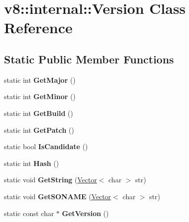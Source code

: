 \hypertarget{classv8_1_1internal_1_1_version}{}\section{v8\+:\+:internal\+:\+:Version Class Reference}
\label{classv8_1_1internal_1_1_version}
\subsection*{Static Public Member Functions}
\begin{DoxyCompactItemize}
\item 
\hypertarget{classv8_1_1internal_1_1_version_a3d8a7322a94b24a794e232e39a810532}{}static int {\bfseries Get\+Major} ()\label{classv8_1_1internal_1_1_version_a3d8a7322a94b24a794e232e39a810532}

\item 
\hypertarget{classv8_1_1internal_1_1_version_a72873948c8d86b18bbf1059481259af8}{}static int {\bfseries Get\+Minor} ()\label{classv8_1_1internal_1_1_version_a72873948c8d86b18bbf1059481259af8}

\item 
\hypertarget{classv8_1_1internal_1_1_version_a5fc1a8f4abe00d63ce6b1de28aa10623}{}static int {\bfseries Get\+Build} ()\label{classv8_1_1internal_1_1_version_a5fc1a8f4abe00d63ce6b1de28aa10623}

\item 
\hypertarget{classv8_1_1internal_1_1_version_a60b6f29b460ab319280241a1b6273330}{}static int {\bfseries Get\+Patch} ()\label{classv8_1_1internal_1_1_version_a60b6f29b460ab319280241a1b6273330}

\item 
\hypertarget{classv8_1_1internal_1_1_version_ae62c0c059d688ed1b252311d319b56dd}{}static bool {\bfseries Is\+Candidate} ()\label{classv8_1_1internal_1_1_version_ae62c0c059d688ed1b252311d319b56dd}

\item 
\hypertarget{classv8_1_1internal_1_1_version_a3cda690f1ad81757d86a7fe3d97ebef4}{}static int {\bfseries Hash} ()\label{classv8_1_1internal_1_1_version_a3cda690f1ad81757d86a7fe3d97ebef4}

\item 
\hypertarget{classv8_1_1internal_1_1_version_aebe98dec5081ad84f4c539d5b5f661e0}{}static void {\bfseries Get\+String} (\hyperlink{classv8_1_1internal_1_1_vector}{Vector}$<$ char $>$ str)\label{classv8_1_1internal_1_1_version_aebe98dec5081ad84f4c539d5b5f661e0}

\item 
\hypertarget{classv8_1_1internal_1_1_version_acd1702b2f55cc5b7955c03c4b56d813a}{}static void {\bfseries Get\+S\+O\+N\+A\+M\+E} (\hyperlink{classv8_1_1internal_1_1_vector}{Vector}$<$ char $>$ str)\label{classv8_1_1internal_1_1_version_acd1702b2f55cc5b7955c03c4b56d813a}

\item 
\hypertarget{classv8_1_1internal_1_1_version_a0e4c59ed561ad523f362ba1a5a9b2ca0}{}static const char $\ast$ {\bfseries Get\+Version} ()\label{classv8_1_1internal_1_1_version_a0e4c59ed561ad523f362ba1a5a9b2ca0}

\end{DoxyCompactItemize}
